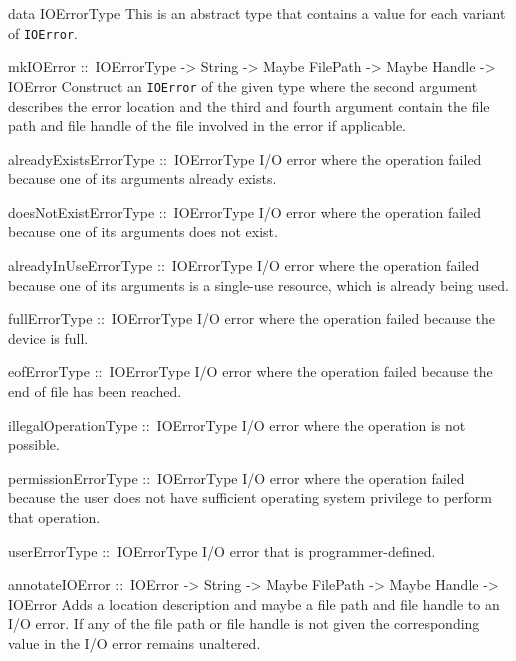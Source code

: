 \documentclass[a4paper,twoside]{article}
\makeatletter
\newcommand{\code}[1]{\texttt{#1}}      %
\newenvironment{codedesc}{%
  \list{}{\labelwidth\z@
    \let\makelabel\codedesclabel}
  }{%
  \endlist
  }
\newcommand*{\codedesclabel}[1]{%
  \hspace{-\leftmargin}
  \parbox[b]{\labelwidth}{\makebox[0pt][l]{\code{#1}}\\}\hfil\relax
  }
\makeatother
\begin{document}
\begin{codedesc}
\item[data IOErrorType] This is an abstract type that contains a value for
  each variant of \code{IOError}.

\item[mkIOError ::\ IOErrorType -> String -> Maybe FilePath -> Maybe Handle
  -> IOError] Construct an \code{IOError} of the given type where the second
  argument describes the error location and the third and fourth argument
  contain the file path and file handle of the file involved in the error if
  applicable. 
  
\item[alreadyExistsErrorType ::\ IOErrorType] I/O error where the operation
  failed because one of its arguments already exists.
  
\item[doesNotExistErrorType ::\ IOErrorType] I/O error where the operation
  failed because one of its arguments does not exist.
  
\item[alreadyInUseErrorType ::\ IOErrorType] I/O error where the operation
  failed because one of its arguments is a single-use resource, which is
  already being used.
  
\item[fullErrorType ::\ IOErrorType] I/O error where the operation failed
  because the device is full.
  
\item[eofErrorType ::\ IOErrorType] I/O error where the operation failed
  because the end of file has been reached.
  
\item[illegalOperationType ::\ IOErrorType] I/O error where the operation is
  not possible.
  
\item[permissionErrorType ::\ IOErrorType] I/O error where the operation failed
  because the user does not have sufficient operating system privilege to
  perform that operation.

\item[userErrorType ::\ IOErrorType] I/O error that is programmer-defined.

\item[annotateIOError ::\ IOError -> String -> Maybe FilePath -> Maybe
  Handle -> IOError] Adds a location description and maybe a file path and
  file handle to an I/O error.  If any of the file path or file handle is not
  given the corresponding value in the I/O error remains unaltered.
\end{codedesc}
\end{document}
